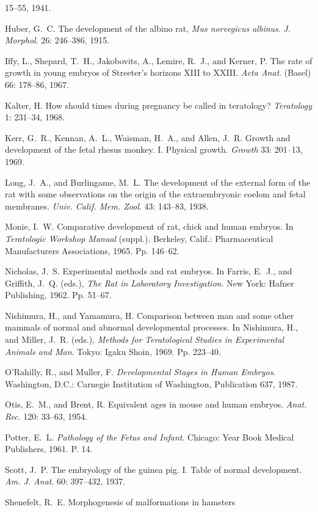 \begin{numreferences}
15--55, 1941.
\item Huber, G.~C. The development of the albino rat,
{\it Mus norvegicus albinus}. {\it J. Morphol}. 26: 246--386, 1915.
\item Iffy, L., Shepard, T.~H., Jakobovits, A., Lemire, R.~J., and Kerner, P.
The rate of growth in young
embryos of Streeter's horizons XIII to XXIII. {\it Acta Anat}.
(Basel) 66: 178--86, 1967.
\item Kalter, H. How should times during pregnancy be called in teratology?
{\it Teratology} 1: 231--34, 1968.
\item Kerr, G.~R., Kennan, A.~L., Waisman, H.~A., and Allen, J.~R.
Growth and development of the
fetal rhesus monkey. I. Physical growth. {\it Growth} 33: 201--13, 1969.
\item Long, J.~A., and Burlingame, M.~L. 
The development of the external form of the rat with some
observations on the origin of the extraembryonic coelom and fetal membranes.
{\it Univ. Calif.  Mem. Zool}. 43: 143--83, 1938.
\item Monie, I.~W. Comparative development of rat, chick and human embryos.
In {\it Teratologic Workshop Manual} (suppl.). Berkeley, Calif.:
Pharmaceutical Manufacturers Associations,
1965. Pp. 146--62.
\item Nicholas, J.~S. Experimental methods and rat embryos.
In Farris, E.~J., and Griffith, J.~Q.
(eds.), {\it The Rat in Laboratory Investigation}. New York:
Hafner Publishing, 1962. Pp. 51--67.
\item Nishimura, H., and Yamamura, H. Comparison between man and some other mammals of
normal and abnormal developmental processes. In Nishimura, H.,
and Miller, J.~R. (eds.),
{\it Methods for Teratological Studies in Experimental Animals and Man}.
Tokyo: Igaku Shoin,
1969. Pp. 223--40.
\item O'Rahilly, R., and Muller, F. {\it Developmental Stages in Human
Embryos}. Washington, D.C.:
Carnegie Institution of Washington, Publication 637, 1987.
\item Otis, E.~M., and Brent, R. Equivalent ages in mouse and human embryos.
{\it Anat. Rec}. 120: 33--63, 1954.
\item Potter, E.~L. {\it Pathology of the Fetus and Infant}. Chicago:
Year Book Medical Publishers, 1961.
P. 14.
\item Scott, J.~P. The embryology of the guinea pig. I. Table of 
normal development. {\it Am. J. Anat}.
60: 397--432, 1937.
\item Shenefelt, R.~E. Morphogenesis of malformations in hamsters

\end{numreferences}
